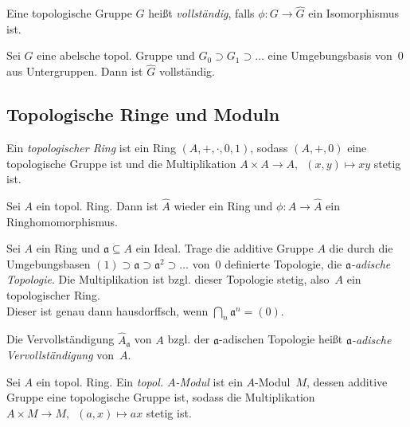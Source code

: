 \documentclass{cheat-sheet}
\newcommand{\aaa}{\mathfrak{a}}
\begin{document}
\begin{defn}
  Eine topologische Gruppe $G$ heißt \emph{vollständig}, falls $\phi : G \to \hat{G}$ ein Isomorphismus ist.
\end{defn}

\begin{prop}
  Sei $G$ eine abelsche topol. Gruppe und $G_0 \supset G_1 \supset \ldots$ eine Umgebungsbasis von~$0$ aus Untergruppen.
  Dann ist $\hat{G}$ vollständig.
\end{prop}

\subsection{Topologische Ringe und Moduln}

\begin{defn}
  Ein \emph{topologischer Ring} ist ein Ring $(A, +, \cdot, 0, 1)$, sodass $(A, +, 0)$ eine topologische Gruppe ist und die Multiplikation $A \times A \to A, \enspace (x, y) \mapsto xy$ stetig ist.
\end{defn}

\begin{bem}
  Sei $A$ ein topol. Ring.
  Dann ist $\hat{A}$ wieder ein Ring und $\phi : A \to \hat{A}$ ein Ringhomomorphismus.
\end{bem}

\begin{konstr}
  Sei $A$ ein Ring und $\aaa \subseteq A$ ein Ideal.
  Trage die additive Gruppe $A$ die durch die Umgebungsbasen $(1) \supset \aaa \supset \aaa^2 \supset \ldots$ von~$0$ definierte Topologie, die \emph{$\aaa$-adische Topologie}.
  Die Multiplikation ist bzgl. dieser Topologie stetig, also~$A$ ein topologischer Ring. \\
  Dieser ist genau dann hausdorffsch, wenn $\bigcap_n \aaa^n = (0)$.
\end{konstr}

\begin{defn}
  Die Vervollständigung $\hat{A}_\aaa$ von $A$ bzgl. der $\aaa$-adischen Topologie heißt \emph{$\aaa$-adische Vervollständigung} von~$A$.
\end{defn}

\begin{defn}
  Sei $A$ ein topol. Ring.
  Ein \emph{topol. $A$-Modul} ist ein $A$-Modul~$M$, dessen additive Gruppe eine topologische Gruppe ist, sodass die Multiplikation $A \times M \to M, \enspace (a, x) \mapsto ax$ stetig ist.
\end{defn}
\end{document}
